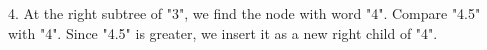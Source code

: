 \documentclass[preview]{standalone}
\begin{document}
4. At the right subtree of "3", we find the node with word "4". Compare "4.5" with "4". Since "4.5" is greater, we insert it as a new right child of "4".\\
\end{document}
